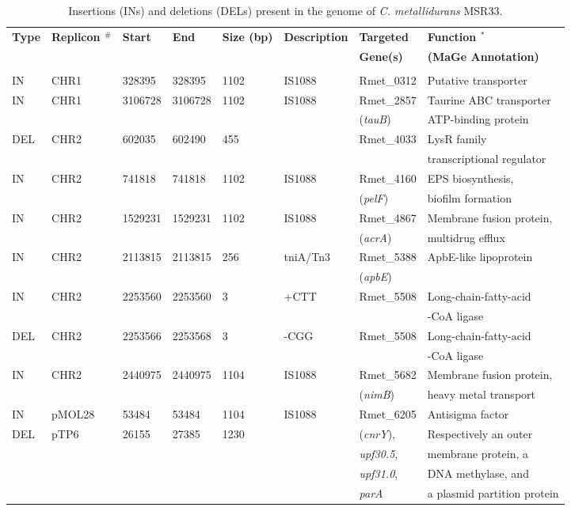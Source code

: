 \begin{table}
\caption{Insertions (INs) and deletions (DELs) present in the genome of \textit{C. metallidurans} MSR33.\\}
\label{table:42}%
{%
\begin{tabular*}{\columnwidth}{@{}llllllll@{}}
\hline
\textbf{Type} & \textbf{Replicon $^\#$} & \textbf{Start} & \textbf{End} & \textbf{Size (bp)} & \textbf{Description} & \textbf{Targeted} & \textbf{Function $^*$} \\
&  &  &  &  &  &  \textbf{Gene(s)}& \textbf{(MaGe Annotation)} \\
\hline
\\
IN & CHR1 &	328395 & 328395 & 1102 & IS1088 & Rmet\_0312 & Putative transporter \\
IN	& CHR1 & 3106728 & 3106728 & 1102 & IS1088 & Rmet\_2857 & Taurine ABC transporter \\
	&  &  &  &  &  &  (\textit{tauB}) &  ATP-binding protein\\
DEL &	CHR2 &	602035 &	602490 &	455	& &	Rmet\_4033 &	LysR family  \\
 &	 &	 &	 &		& &	& transcriptional regulator\\
IN &	CHR2 &	741818 &	741818 &	1102 &	IS1088 &	Rmet\_4160  &	EPS biosynthesis, \\
 &	 &	& &	 &	 & (\textit{pelF}) &	biofilm formation\\
IN &	CHR2 &	1529231 &	1529231 &	1102 &	IS1088 &	Rmet\_4867  &	Membrane fusion protein,\\
 &	 &	 &	 &	 &	 & (\textit{acrA}) &	multidrug efflux\\
IN &	CHR2 &	2113815 &	2113815 &	256 &	tniA/Tn3 &	Rmet\_5388  &	ApbE-like lipoprotein\\
 &	 &	 &	 &	 &	 &  (\textit{apbE}) & \\
IN &	CHR2 &	2253560 &	2253560 &	3 &	+CTT &	Rmet\_5508 &	Long-chain-fatty-acid\\
 &	 &	 &	 &	 & & & -CoA ligase\\
DEL &	CHR2 &	2253566 &	2253568 &	3 &	-CGG &	Rmet\_5508 &	Long-chain-fatty-acid\\
 &	 &	 &	 &	 & & & -CoA ligase\\
IN &	CHR2 &	2440975 &	2440975 &	1104 &	IS1088 &	Rmet\_5682 &	Membrane fusion protein, \\
 &	 &	 &	 &	 &	 &  (\textit{nimB})	& heavy metal transport\\
IN &	pMOL28 &	53484 &	53484 &	1104 &	IS1088 &	Rmet\_6205 &	Antisigma factor\\
DEL &	pTP6 &	26155 &	27385 &	1230 &	&	 (\textit{cnrY}),  &	Respectively an outer  \\
 &	 &	 &	 &	 &	& \textit{upf30.5}, & membrane protein, a \\
  &	 &	 &	 &	 &	& \textit{upf31.0}, &	DNA methylase, and \\
    &	 &	 &	 &	 &	& \textit{parA} &	a plasmid partition protein\\


\end{tabular*}}
\end{table}

